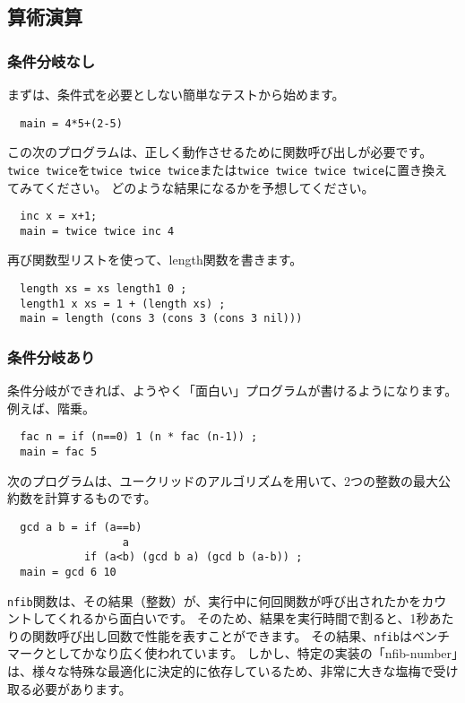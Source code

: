 \documentclass{jarticle}
\begin{document}
\subsection{算術演算}

\subsubsection{条件分岐なし}

まずは、条件式を必要としない簡単なテストから始めます。

\begin{verbatim}
  main = 4*5+(2-5)
\end{verbatim}

この次のプログラムは、正しく動作させるために関数呼び出しが必要です。
\texttt{twice twice}を\texttt{twice twice twice}または\texttt{twice twice twice twice}に置き換えてみてください。
どのような結果になるかを予想してください。

\begin{verbatim}
  inc x = x+1;
  main = twice twice inc 4
\end{verbatim}

再び関数型リストを使って、length関数を書きます。

\begin{verbatim}
  length xs = xs length1 0 ;
  length1 x xs = 1 + (length xs) ;
  main = length (cons 3 (cons 3 (cons 3 nil)))
\end{verbatim}

\subsubsection{条件分岐あり}

条件分岐ができれば、ようやく「面白い」プログラムが書けるようになります。
例えば、階乗。

\begin{verbatim}
  fac n = if (n==0) 1 (n * fac (n-1)) ;
  main = fac 5
\end{verbatim}

次のプログラムは、ユークリッドのアルゴリズムを用いて、2つの整数の最大公約数を計算するものです。

\begin{verbatim}
  gcd a b = if (a==b)
                  a
            if (a<b) (gcd b a) (gcd b (a-b)) ;
  main = gcd 6 10
\end{verbatim}

\texttt{nfib}関数は、その結果（整数）が、実行中に何回関数が呼び出されたかをカウントしてくれるから面白いです。
そのため、結果を実行時間で割ると、1秒あたりの関数呼び出し回数で性能を表すことができます。
その結果、\texttt{nfib}はベンチマークとしてかなり広く使われています。
しかし、特定の実装の「nfib-number」は、様々な特殊な最適化に決定的に依存しているため、非常に大きな塩梅で受け取る必要があります。
\end{document}
